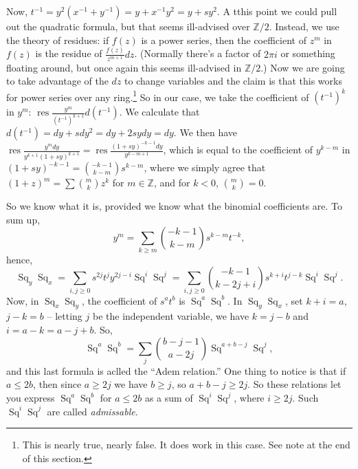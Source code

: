 \documentclass{article}
\newcommand{\Z}{\mathbb{Z}}
\DeclareMathOperator{\res}{res}
\DeclareMathOperator{\Sq}{Sq}
\begin{document}
Now, $t^{-1} = y^2(x^{-1} + y^{-1}) = y + x^{-1} y^2 = y + s y^2$.  A tthis point we could pull out the quadratic formula, but that seems ill-advised over $\Z/2$.  Instead, we use the theory of residues: if $f(z)$ is a power series, then the coefficient of $z^m$ in $f(z)$ is the residue of $\frac{f(z)}{z^{m+1}}dz$.  (Normally there's a factor of $2 \pi i$ or something floating around, but once again this seems ill-advised in $\Z/2$.)  Now we are going to take advantage of the $dz$ to change variables and the claim is that this works for power series over any ring.\footnote{This is nearly true, nearly false.  It does work in this case.  See note at the end of this section.}  So in our case, we take the coefficient of $(t^{-1})^k$ in $y^m$: $\res \frac{y^m}{(t^{-1})^{k+1}} d(t^{-1})$.  We calculate that $d(t^{-1}) = dy + sdy^2 = dy + 2sydy = dy$.  We then have $\res \frac{y^m dy}{y^{k+1}(1 + sy)^{k+1}} = \res \frac{(1+sy)^{-k-1} dy}{y^{k-m+1}}$, which is equal to the coefficient of $y^{k-m}$ in $(1+sy)^{-k-1} = \binom{-k-1}{k-m}s^{k-m}$, where we simply agree that $(1 + z)^m = \sum \binom{m}{k} z^k$ for $m \in \Z$, and for $k < 0$, $\binom{m}{k} = 0$.

So we know what it is, provided we know what the binomial coefficients are.  To sum up,
\[
y^m = \sum_{k \ge m} \binom{-k-1}{k-m} s^{k-m} t^{-k}
,\]
hence,
\[
\Sq_y \Sq_x = \sum_{i, j \ge 0} s^{2j} t^j y^{2j-i} \Sq^i \Sq^j = \sum_{i, j \ge 0} \binom{-k-1}{k-2j+i} s^{k+i}t^{j-k}\Sq^i\Sq^j
.\]
Now, in $\Sq_x \Sq_y$, the coefficient of $s^a t^b$ is $\Sq^a \Sq^b$.  In $\Sq_y \Sq_x$, set $k + i = a$, $j - k = b$ -- letting $j$ be the independent variable, we have $k = j - b$ and $i = a - k = a - j + b$.  So,
\[
\Sq^a \Sq^b = \sum_j \binom{b-j-1}{a-2j} \Sq^{a+b-j} \Sq^j
,\]
and this last formula is aclled the ``Adem relation.''  One thing to notice is that if $a \le 2b$, then since $a \ge 2j$ we have $b \ge j$, so $a + b -j \ge 2j$.  So these relations let you express $\Sq^a \Sq^b$ for $a \le 2b$ as a sum of $\Sq^i \Sq^j$, where $i \ge 2j$.  Such $\Sq^i \Sq^j$ are called \emph{admissable}.
\end{document}

